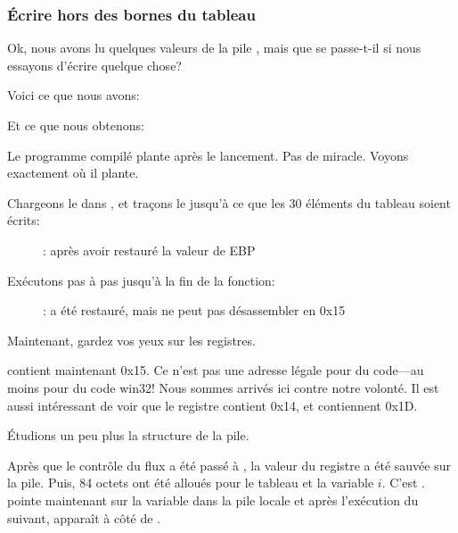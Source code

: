 \subsubsection{Écrire hors des bornes du tableau}

Ok, nous avons lu quelques valeurs de la pile , mais que se passe-t-il
si nous essayons d'écrire quelque chose?

Voici ce que nous avons:




Et ce que nous obtenons:



Le programme compilé plante après le lancement. Pas de miracle. Voyons exactement
où il plante.

\clearpage
\myindex{\olly}

Chargeons le dans \olly, et traçons le jusqu'à ce que les 30 éléments du tableau
soient écrits:

\begin{figure}[H]
\centering
{}
\caption{\olly: après avoir restauré la valeur de EBP}
\label{fig:array_BO_olly_w1}
\end{figure}

\clearpage
Exécutons pas à pas jusqu'à la fin de la fonction:

\begin{figure}[H]
\centering
{}
\caption{\olly: 
 a été restauré, mais \olly ne peut pas désassembler en 0x15}
\label{fig:array_BO_olly_w2}
\end{figure}

Maintenant, gardez vos yeux sur les registres.

\EIP contient maintenant 0x15. Ce n'est pas une adresse légale pour du code---au
moins pour du code win32!
Nous sommes arrivés ici contre notre volonté.
Il est aussi intéressant de voir que le registre \EBP contient 0x14, \ECX et \EDX
contiennent 0x1D.

Étudions un peu plus la structure de la pile.

Après que le contrôle du flux a été passé à \TT{\main}, la valeur du registre \EBP
a été sauvée sur la pile.
Puis, 84 octets ont été alloués pour le tableau et la variable $i$.
C'est .
\ESP pointe maintenant sur la variable  dans la pile locale et après l'exécution
du  suivant,  apparaît à côté de .


